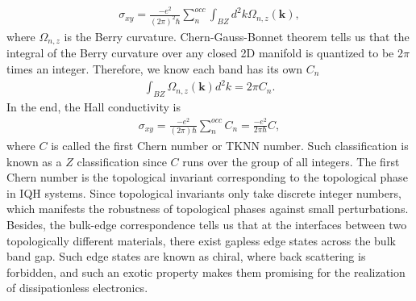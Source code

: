 	\begin{equation}
		\label{sigma_xy}
		\begin{aligned}
			\sigma_{xy} = \frac{-e^2}{(2\pi)^2\hbar} \sum_n^{occ} \int_{BZ} d^2k \Omega_{n,z}(\textbf{k}),
		\end{aligned}
	\end{equation}
where $\Omega_{n,z}$ is the Berry curvature. Chern-Gauss-Bonnet theorem tells us that the integral of the Berry curvature over any closed 2D manifold is quantized to be 2$\pi$ times an integer. Therefore, we know each band has its own $C_n$
	\begin{equation}
		\begin{aligned}
			\int_{BZ} \Omega_{n,z}(\textbf{k}) d^2k = 2\pi C_n.
		\end{aligned}
	\end{equation}
In the end, the Hall conductivity is
	\begin{equation}
		\begin{aligned}
			\sigma_{xy} =\frac{-e^2}{(2\pi)\hbar} \sum_n^{occ} C_n 
			= \frac{-e^2}{2\pi\hbar}C,
		\end{aligned}
	\end{equation}
where $C$ is called the first Chern number or TKNN number. Such classification is known as a $Z$ classiﬁcation since $C$ runs over the group of all integers. The first Chern number is the topological invariant corresponding to the topological phase in IQH systems. Since topological invariants only take discrete integer numbers, which manifests the robustness of topological phases against small perturbations. Besides, the bulk-edge correspondence tells us that at the interfaces between two topologically different materials, there exist gapless edge states across the bulk band gap. Such edge states are known as chiral, where back scattering is forbidden, and such an exotic property makes them promising for the realization of dissipationless electronics.

